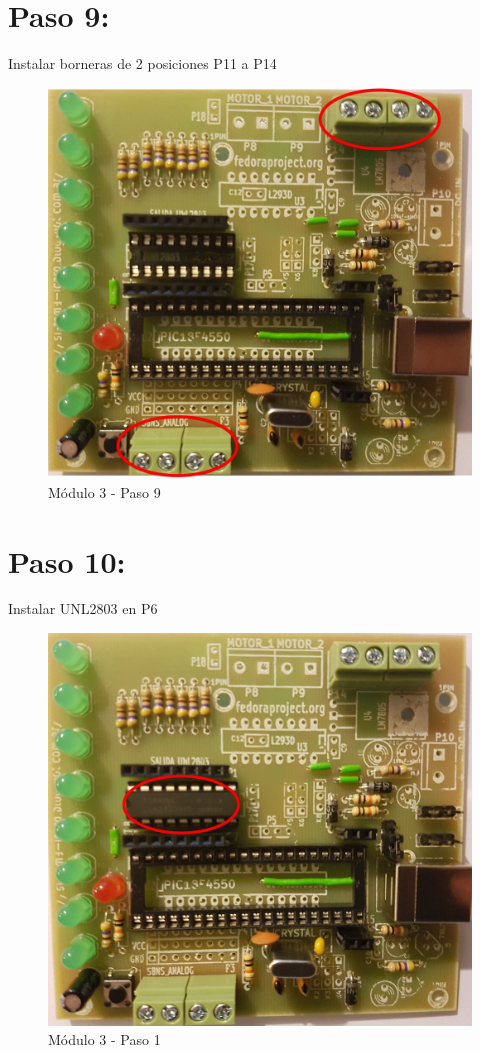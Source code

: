 \newpage

\section{Paso 9:}

Instalar borneras de 2 posiciones P11 a P14

\begin{figure}[h]
	\centering
	\includegraphics[width=0.8\linewidth]{Modulo_3/M3_9}
	\caption{Módulo 3 - Paso 9}
	\label{fig:M3_9}
\end{figure}

\newpage

\section{Paso 10:}

Instalar UNL2803 en P6

\begin{figure}[h]
	\centering
	\includegraphics[width=0.8\linewidth]{Modulo_3/M3_10}
	\caption{Módulo 3 - Paso 1}
	\label{fig:M3_10}
\end{figure}

